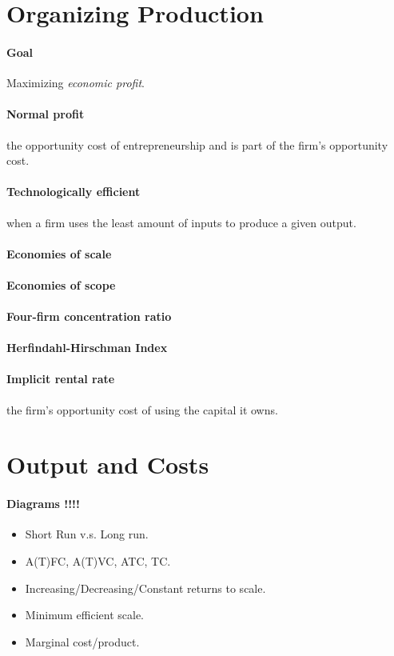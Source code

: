 \documentclass{article}
\begin{document}
	\section{Organizing Production} 
	\paragraph{Goal} Maximizing \emph{economic profit}.
	\paragraph{Normal profit} the opportunity cost of entrepreneurship and is part of the firm's opportunity cost.
	\paragraph{Technologically efficient} when a firm uses the least amount of inputs to produce a given output.
	\paragraph{Economies of scale}
	\paragraph{Economies of scope}
	\paragraph{Four-firm concentration ratio}
	\paragraph{Herfindahl-Hirschman Index}
	\paragraph{Implicit rental rate} the firm's opportunity cost of using the capital it owns.
	\section{Output and Costs}
	\paragraph{Diagrams !!!!}
	\begin{itemize}
		\item Short Run v.s. Long run.
		\item A(T)FC, A(T)VC, ATC, TC.
		\item Increasing/Decreasing/Constant returns to scale.
		\item Minimum efficient scale.
		\item Marginal cost/product.
	\end{itemize}
\end{document}
